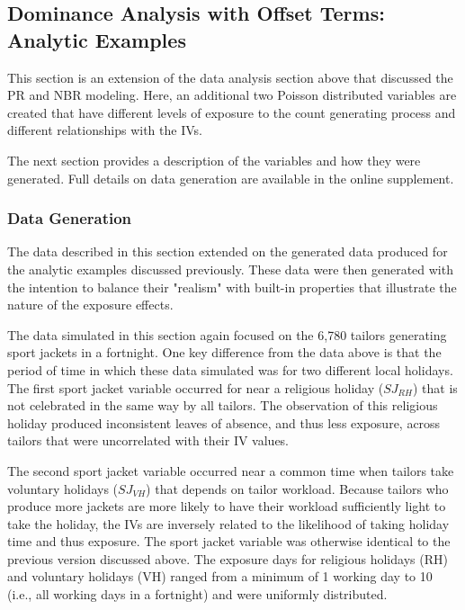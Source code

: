 \documentclass[ShortAfour,times,sageapa]{sagej}
\begin{document}
	\subsection{Dominance Analysis with Offset Terms: Analytic Examples}
	
	This section is an extension of the data analysis section above that discussed the PR and NBR modeling.
	Here, an additional two Poisson distributed variables are created that have different levels of exposure to the count generating process and different relationships with the IVs.
	
	The next section provides a description of the variables and how they were generated. Full details on data generation are available in the online supplement.
	
		\subsubsection{Data Generation}
		
	The data described in this section extended on the generated data produced for the analytic examples discussed previously.
	These data were then generated with the intention to balance their "realism" with built-in properties that illustrate the nature of the exposure effects.
	
	The data simulated in this section again focused on the 6,780 tailors generating sport jackets in a fortnight.
	One key difference from the data above is that the period of time in which these data simulated was for two different local holidays.
	The first sport jacket variable occurred for near a religious holiday ($SJ_{RH}$) that is not celebrated in the same way by all tailors.
	The observation of this religious holiday produced inconsistent leaves of absence, and thus less exposure, across tailors that were uncorrelated with their IV values.
	
	The second sport jacket variable occurred near a common time when tailors take voluntary holidays ($SJ_{VH}$) that depends on tailor workload.
	Because tailors who produce more jackets are more likely to have their workload sufficiently light to take the holiday, the IVs are inversely related to the likelihood of taking holiday time and thus exposure.
	The sport jacket variable was otherwise identical to the previous version discussed above. 
	The exposure days for religious holidays (RH) and voluntary holidays (VH) ranged from a minimum of 1 working day to 10 (i.e., all working days in a fortnight) and were uniformly distributed.
	
\end{document}
